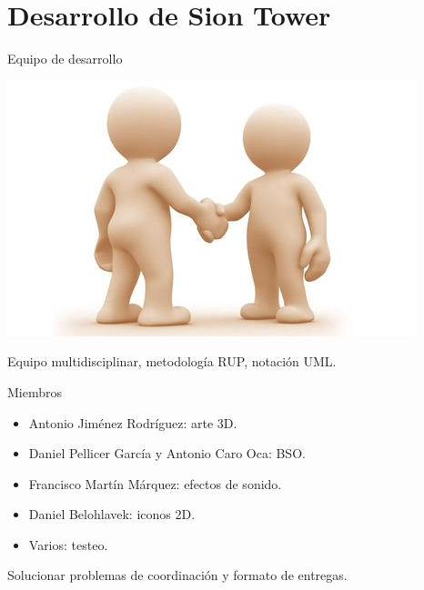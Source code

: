 \documentclass[green]{beamer}
\begin{document}
    

\section[Sion Tower]{Desarrollo de Sion Tower}

    
\begin{frame}{Equipo de desarrollo}
    
    \begin{center}
	\includegraphics[scale=0.12]{img/colaboradores.jpg}
    \end{center}
    
    Equipo multidisciplinar, metodología RUP, notación UML.
    
    \begin{block}{Miembros}
	\begin{itemize}
	    \item Antonio Jiménez Rodríguez: arte 3D.
	    \item Daniel Pellicer García y Antonio Caro Oca: BSO.
	    \item Francisco Martín Márquez: efectos de sonido.
	    \item Daniel Belohlavek: iconos 2D.
	    \item Varios: testeo.
	\end{itemize}
    \end{block}
    
    Solucionar problemas de coordinación y formato de entregas.
    
\end{frame}

    
\end{document}
